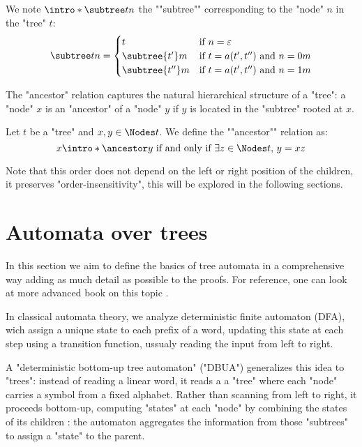 \documentclass[a4paper,UKenglish,cleveref, autoref, thm-restate]{lipics-v2021}
\begin{document}
\begin{definition}
	\AP We note $\intro* \subtree t n$ the ""subtree"" corresponding to the "node" $n$ in the "tree" $t$:
	\[
		\subtree t n =   \begin{cases}
			t                & \text{if }  n = \varepsilon                  \\
			\subtree {t'} m  & \text{if } t = a(t',t'') \text{ and } n = 0m \\
			\subtree {t''} m & \text{if } t = a(t',t'') \text{ and } n = 1m
		\end{cases}
	\]
\end{definition}

The "ancestor" relation captures the natural hierarchical structure of a "tree": a "node" $x$ is an "ancestor"
of a "node" $y$ if $y$ is located in the "subtree" rooted at $x$.

\begin{definition}
	\AP Let $t$ be a "tree" and $x, y \in \Nodes t$. We define the ""ancestor"" relation as:
	\[
		x \intro* \ancestor y \tiff \exists z \in \Nodes t,\, y = xz
	\]
\end{definition}

\begin{remark}
	Note that this order does not depend on the left or right position of the children, \ie it preserves
	"order-insensitivity", this will be explored in the following sections.
\end{remark}


\section{Automata over trees}\label{sec:automata}

In this section we aim to define the basics of tree automata in a comprehensive way adding as much detail as possible to the proofs. For reference,
one can look at more advanced book on this topic \cite{tata,Thomas1997,bookautomata}.

In classical automata theory, we analyze deterministic finite automaton (DFA), wich assign a unique state to each prefix of
a word, updating this state at each step using a transition function, ussualy reading the input from left to right.

A "deterministic bottom-up tree automaton" ("DBUA") generalizes this idea to "trees": instead of reading a linear word, it reads a
a "tree" where each "node" carries a symbol from a fixed alphabet. Rather than scanning from left to right, it proceeds
bottom-up, computing "states" at each "node" by combining the states of its children :
the automaton aggregates the information from those "subtrees" to assign a "state" to the parent.
\end{document}
